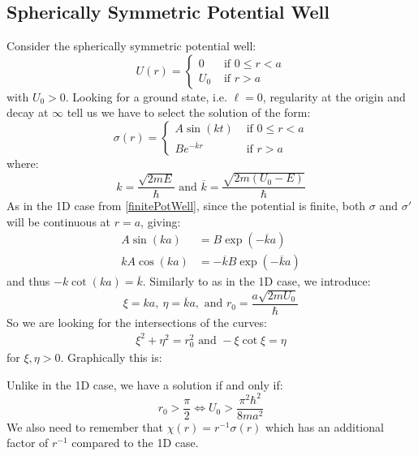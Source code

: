 \documentclass[../main.tex]{subfiles}
\begin{document}
\subsection{Spherically Symmetric Potential Well}
Consider the spherically symmetric potential well:
\[
  U(r) = \begin{cases}
  0 & \text{ if } 0 \leq r < a \\
  U_0 & \text{ if } r > a
  \end{cases}
\]
with $U_0 > 0$.
Looking for a ground state, i.e. $\ell = 0$, regularity at the origin and decay at $\infty$ tell us we have to select the solution of the form:
\[
  \sigma(r) = \begin{cases}
  A \sin(kt) & \text{ if } 0 \leq r < a \\
  Be^{-\overline{k} r} & \text{ if } r > a
  \end{cases}
\]
where:
\[
  k = \frac{\sqrt{2mE}}{\hbar} \text{ and } \overline{k} = \frac{\sqrt{2m(U_0 - E)}}{\hbar}
\]
As in the 1D case from \cref{finitePotWell}, since the potential is finite, both $\sigma$ and $\sigma'$ will be continuous at $r = a$, giving:
\begin{align*}
  A \sin(ka) &= B\exp(-\overline{k} a) \\
  kA \cos(ka) &= - \overline{k} B\exp(-\overline{k} a)
\end{align*}
and thus $-k \cot(ka) = \overline{k}$.
Similarly to as in the 1D case, we introduce:
\[
  \xi = ka,\ \eta = \overline{k}a, \text{ and } r_0 = \frac{a\sqrt{2mU_0}}{\hbar}
\]
So we are looking for the intersections of the curves:
\begin{align*}
  \xi^2 + \eta^2 = r^2_0 \text{ and } -\xi \cot \xi = \eta
\end{align*}
for $\xi, \eta > 0$.
Graphically this is:
\begin{center}
\end{center}
Unlike in the 1D case, we have a solution if and only if:
\[
  r_0 > \frac{\pi}{2} \iff U_0 > \frac{\pi^2 \hbar^2}{8ma^2}
\]
We also need to remember that $\chi(r) = r^{-1}\sigma(r)$ which has an additional factor of $r^{-1}$ compared to the 1D case.
\end{document}
